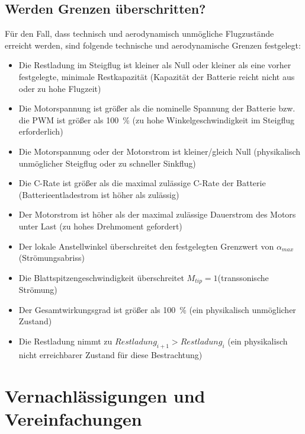\subsection{Werden Grenzen überschritten?}
Für den Fall, dass technisch und aerodynamisch unmögliche Flugzustände erreicht werden, sind folgende technische und aerodynamische Grenzen festgelegt:
\begin{itemize}
	\item Die Restladung im Steigflug ist kleiner als  Null oder kleiner als eine vorher festgelegte, minimale Restkapazität (Kapazität der Batterie reicht nicht aus oder zu hohe Flugzeit)
	\item Die Motorspannung ist größer als die nominelle Spannung der Batterie bzw. die PWM ist größer als \SI{100}{\%} (zu hohe Winkelgeschwindigkeit im Steigflug erforderlich)
	\item Die Motorspannung oder der Motorstrom ist kleiner/gleich Null (physikalisch unmöglicher Steigflug oder zu schneller Sinkflug)
	\item Die C-Rate ist größer als die maximal zulässige C-Rate der Batterie (Batterieentladestrom ist höher als zulässig)
	\item Der Motorstrom ist höher als der maximal zulässige Dauerstrom des Motors unter Last (zu hohes Drehmoment gefordert)
	\item Der lokale Anstellwinkel überschreitet den festgelegten Grenzwert von \ensuremath{\alpha_{max}}(Strömungsabriss)
	\item Die Blattspitzengeschwindigkeit überschreitet \ensuremath{M_{tip}=1}(transsonische Strömung)
	\item Der Gesamtwirkungsgrad ist größer als \SI{100}{\%} (ein physikalisch unmöglicher Zustand)
	\item Die Restladung nimmt zu \ensuremath{Restladung_{i+1} > Restladung_{i}} (ein physikalisch nicht erreichbarer Zustand für diese Bestrachtung)
\end{itemize}

\section{Vernachlässigungen und Vereinfachungen}
\label{sec:vernachlaessigungen_vereinfachungen}

